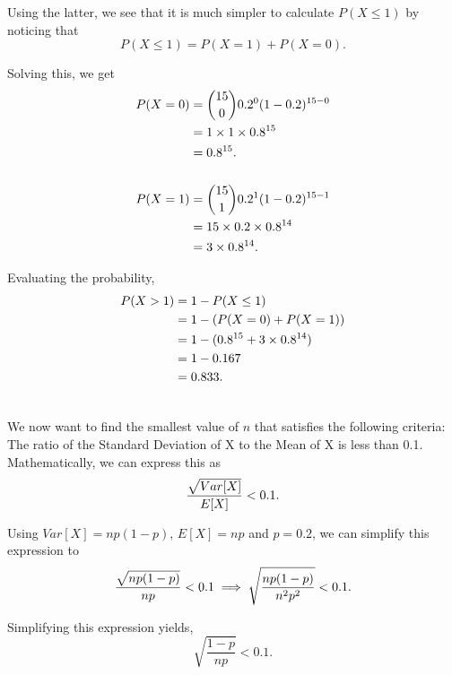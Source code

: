 \begin{subquestions}
\begin{subsubquestions}
Using the latter, we see that it is much simpler to calculate $P(X\leq1) $   by noticing that 
\begin{equation}
P(X \leq 1)  =  P(X=1)+P(X=0). 
\end{equation}

Solving this, we get
\begin{align}
	P(X=0)&={ 15 \choose 0} 0.2^0 (1-0.2)^{15-0} \nonumber \\
	&=1\times1\times0.8^{15} \nonumber \\
	&=0.8^{15}.\nonumber \\ \nonumber \\
	P(X=1)&={ 15 \choose 1} 0.2^1 (1-0.2)^{15-1} \nonumber \\
	&=15 \times 0.2 \times 0.8^{14} \nonumber \\
	&=3\times 0.8^{14}. 
\end{align}

Evaluating the probability,
\begin{align}
	P(X>1)&=1-P(X\leq1) \nonumber \\
	&=1-(P(X=0)+P(X=1)) \nonumber \\
	&=1-(0.8^{15}+3\times0.8^{14}) \nonumber \\
	&=1- 0.167 \nonumber \\
	&=0.833. \\ \nonumber
	\end{align}



\subsubquestion
We now want to find the smallest value of $n$ that satisfies the following criteria: \\The ratio of the Standard Deviation of X to the Mean of X is less than 0.1.\\

Mathematically, we can express this as
\begin{equation}
	\frac{\sqrt{Var[X]}}{E[X]}< 0.1.  \\ 
	\end{equation}

Using $Var[X]=np(1-p)$, $E[X]=np$ and $p=0.2$, we can simplify this expression to
\begin{equation}
	\frac{\sqrt{np(1-p)}}{np}<0.1 \implies \sqrt{\frac{np(1-p)}{n^2p^2}}<0.1.  \\ 
	\end{equation}

Simplifying this expression yields,
\begin{equation}
	\sqrt{\frac{1-p}{np}}<0.1.
	\end{equation}


\end{subsubquestions}
\end{subquestions}
